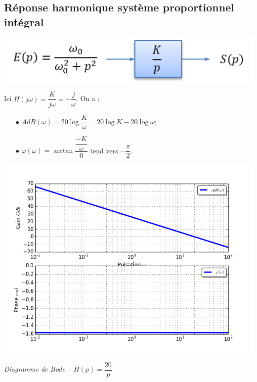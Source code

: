 \documentclass[10pt,oneside]{article}
\begin{document}
\subsection{Réponse harmonique système proportionnel intégral}
\begin{minipage}[c]{.48\linewidth}
\begin{center}
\includegraphics[width=.9\textwidth]{png/proportionnel_integral_bloc}
\end{center}
Ici $H(j\omega)=\dfrac{K}{j\omega}=-\dfrac{j}{\omega}$. On a :
\begin{itemize}
\item [$\bullet$] $AdB(\omega)=20 \log \dfrac{K}{\omega}=20\log K -20\log \omega$;
\item [$\bullet$] $\varphi(\omega)= \arctan \dfrac{\dfrac{-K}{\omega}}{0}$ tend vers $-\dfrac{\pi}{2}$.
\end{itemize}
\end{minipage}\hfill
\begin{minipage}[c]{.48\linewidth}
\begin{center}
\includegraphics[width=.9\textwidth]{png/proportionnel_integral_bode}

\textit{Diagramme de Bode -- $H(p)= \dfrac{20}{p}$}
\end{center}
\end{minipage}
\end{document}
